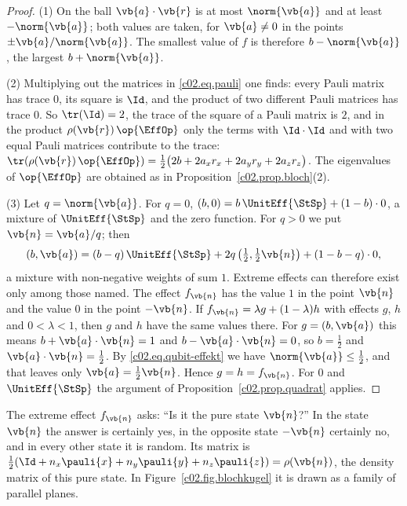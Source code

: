 \begin{proof}
  (1) On the ball $\vb{a}\cdot\vb{r}$ is at most $\norm{\vb{a}}$ and at least
  $-\norm{\vb{a}}$; both values are taken, for $\vb{a} \neq 0$ in the points
  $\pm\vb{a}/\norm{\vb{a}}$. The smallest value of $f$ is therefore $b - \norm{\vb{a}}$,
  the largest $b + \norm{\vb{a}}$.

  (2) Multiplying out the matrices in \eqref{c02.eq.pauli} one finds: every Pauli matrix
  has trace $0$, its square is $\Id$, and the product of two different Pauli matrices has
  trace $0$. So $\tr(\Id) = 2$, the trace of the square of a Pauli matrix is $2$, and in
  the product $\rho(\vb{r})\,\op{\EffOp}$ only the terms with $\Id\cdot\Id$ and with two equal
  Pauli matrices contribute to the trace:
  $\tr(\rho(\vb{r})\,\op{\EffOp}) = \tfrac12\bigl(2b + 2 a_x r_x + 2 a_y r_y + 2 a_z r_z\bigr)$.
  The eigenvalues of $\op{\EffOp}$ are obtained as in Proposition~\ref{c02.prop.bloch}(2).

  (3) Let $q = \norm{\vb{a}}$. For $q = 0$,
  $(b, 0) = b\, \UnitEff{\StSp} + (1 - b)\cdot 0$, a mixture of $\UnitEff{\StSp}$ and the
  zero function. For $q > 0$ we put $\vb{n} = \vb{a}/q$; then
  \begin{equation*}
    (b, \vb{a}) = (b - q)\, \UnitEff{\StSp} + 2q\, \bigl(\tfrac12, \tfrac12\vb{n}\bigr) + (1 - b - q)\cdot 0 ,
  \end{equation*}
  a mixture with non-negative weights of sum $1$. Extreme effects can therefore exist only
  among those named. The effect $f_{\vb{n}}$ has the value $1$ in the point $\vb{n}$ and
  the value $0$ in the point $-\vb{n}$. If $f_{\vb{n}} = \lambda g + (1-\lambda) h$ with
  effects $g$, $h$ and $0 < \lambda < 1$, then $g$ and $h$ have the same values there. For
  $g = (b, \vb{a})$ this means $b + \vb{a}\cdot\vb{n} = 1$ and $b - \vb{a}\cdot\vb{n} = 0$,
  so $b = \tfrac12$ and $\vb{a}\cdot\vb{n} = \tfrac12$. By \eqref{c02.eq.qubit-effekt} we
  have $\norm{\vb{a}} \leq \tfrac12$, and that leaves only $\vb{a} = \tfrac12\vb{n}$. Hence
  $g = h = f_{\vb{n}}$. For $0$ and $\UnitEff{\StSp}$ the argument of
  Proposition~\ref{c02.prop.quadrat} applies.
\end{proof}

The extreme effect $f_{\vb{n}}$ asks: “Is it the pure state $\vb{n}$?” In the state
$\vb{n}$ the answer is certainly yes, in the opposite state $-\vb{n}$ certainly no, and in
every other state it is random. Its matrix is
$\tfrac12(\Id + n_x\pauli{x} + n_y\pauli{y} + n_z\pauli{z}) = \rho(\vb{n})$, the density
matrix of this pure state. In Figure~\ref{c02.fig.blochkugel} it is drawn as a family of
parallel planes.


